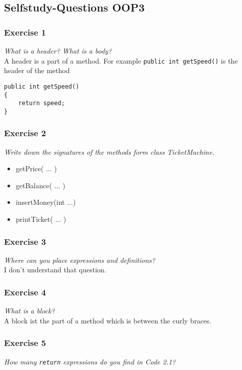 



\subsection{Selfstudy-Questions OOP3}

\subsubsection*{Exercise 1}
\textit{What is a header? What is a body?}\\

A header is a part of a method. For example \lstinline{public int getSpeed()}
is the header of the method
\begin{lstlisting}
public int getSpeed()
{
	return speed;
}
\end{lstlisting}

\subsubsection*{Exercise 2}
\textit{Write down the signatures of the methods form class
TicketMachine.}\\

\begin{itemize}
	\item getPrice( ... )
	\item getBalance( ... )
	\item insertMoney(int ...)
	\item printTicket( ... )
\end{itemize}

\subsubsection*{Exercise 3}
\textit{Where can you place expressions and definitions?}\\

I don't understand that question.

\subsubsection*{Exercise 4}
\textit{What is a block?}\\

A block ist the part of a method which is between the curly braces.

\subsubsection*{Exercise 5}
\textit{How many \lstinline{return} expressions do you find in Code 2.1?}\\



